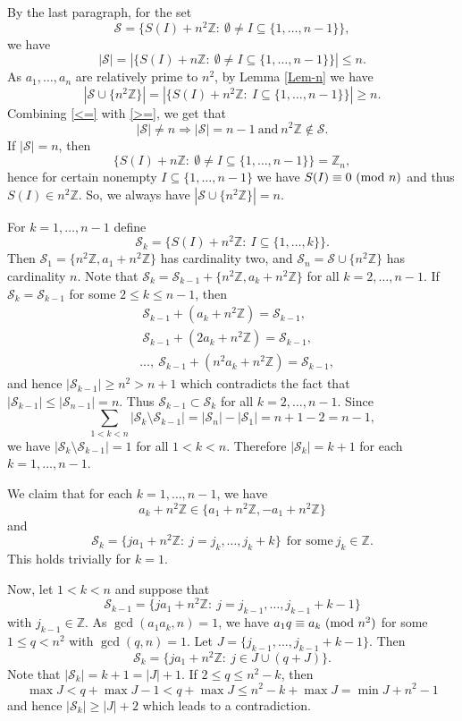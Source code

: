 \documentclass[11pt,reqno]{amsart}
\def\pmod #1{\ ({\rm{mod}}\ #1)}
\def\Z{\mathbb Z}
\def\t{\text}
\def\ls{\leqslant}
\def\gs{\geqslant}
\def\se {\subseteq}
\def\sm{\setminus}
\def\eq{\equiv}
\theoremstyle{plain}
\theoremstyle{definition}
\theoremstyle{remark}
\begin{document}
By the last paragraph, for the set
$${\mathcal S}=\{S(I)+n^2\Z:\ \emptyset \not=I\se\{1,\ldots,n-1\}\},$$
we have
\begin{equation}\label{<=}
|{\mathcal S}|=|\{S(I)+n\Z:\ \emptyset \not=I\se\{1,\ldots,n-1\}\}|\ls n.
\end{equation}
As $a_1,\ldots,a_n$ are relatively prime to $n^2$, by Lemma \ref{Lem-n} we have
\begin{equation}\label{>=} |{\mathcal S}\cup\{n^2\Z\}|=|\{S(I)+n^2\Z:\  I\se\{1,\ldots,n-1\}\}|\gs n.
\end{equation}
Combining \eqref{<=} with \eqref{>=}, we get that
$$|{\mathcal S}|\not=n\Rightarrow |{\mathcal S}|=n-1\ \t{and}\ n^2\Z\not\in {\mathcal S}.$$
If $|{\mathcal S}|=n$, then
$$\{S(I)+n\Z:\ \emptyset \not=I\se\{1,\ldots,n-1\}\}=\Z_n,$$
hence for certain nonempty $I\se\{1,\ldots,n-1\}$ we have $S(I)\eq0\pmod n$ and thus $S(I)\in n^2\Z$.
So, we always have $|{\mathcal S}\cup\{n^2\Z\}|=n$.

For $k=1,\ldots,n-1$ define
$${\mathcal S}_k=\{S(I)+n^2\Z:\ I\se\{1,\ldots,k\}\}.$$
Then ${\mathcal S}_1=\{n^2\Z,a_1+n^2\Z\}$ has cardinality two, and ${\mathcal S}_n={\mathcal S}\cup\{n^2\Z\}$ has cardinality $n$.
Note that ${\mathcal S_{k}}={\mathcal S}_{k-1}+\{n^2\Z,a_k+n^2\Z\}$
for all $k=2,\ldots,n-1$. If ${\mathcal S}_k={\mathcal S}_{k-1}$ for some $2\ls k\ls n-1$, then
\begin{align*}&\ {\mathcal S}_{k-1}+(a_k+n^2\Z)={\mathcal S}_{k-1},
\\&\
{\mathcal S}_{k-1}+(2a_k+n^2\Z)={\mathcal S}_{k-1},
\\& \ldots,\
{\mathcal S}_{k-1}+(n^2a_k+n^2\Z)={\mathcal S}_{k-1},
\end{align*}
and hence $|{\mathcal S}_{k-1}|\gs n^2>n+1$ which contradicts
the fact that $|{\mathcal S}_{k-1}|\ls |{\mathcal S}_{n-1}|=n$.
Thus ${\mathcal S}_{k-1}\subset {\mathcal S}_k$ for all $k=2,\ldots,n-1$.
Since
$$\sum_{1<k<n} |{\mathcal S}_k\sm {\mathcal S}_{k-1}|=
|{\mathcal S}_n|-|{\mathcal S}_1|=n+1-2=n-1,$$
we have $|{\mathcal S}_k\sm {\mathcal S}_{k-1}|=1$ for all $1<k<n$.
Therefore $|{\mathcal S}_k|=k+1$ for each $k=1,\ldots,n-1$.

We claim that for each $k=1,\ldots,n-1$, we have
$$a_k+n^2\Z\in\{a_1+n^2\Z,-a_1+n^2\Z\}$$
and
$$ {\mathcal S}_k=\{ja_1+n^2\Z:\ j=j_k,\ldots,j_k+k\}\ \ \t{for some}\ j_k\in\Z.$$
This holds trivially for $k=1$.

Now, let $1<k<n$ and suppose that
$$ {\mathcal S}_{k-1}=\{ja_1+n^2\Z:\ j=j_{k-1},\ldots,j_{k-1}+k-1\}$$
with $j_{k-1}\in\Z.$ As $\gcd(a_1a_k,n)=1$, we have $a_1q\eq a_k\pmod{n^2}$ for some $1\ls q<n^2$
with $\gcd(q,n)=1$. Let $J=\{j_{k-1},\ldots,j_{k-1}+k-1\}$. Then
$${\mathcal S}_k=\{ja_1+n^2\Z:\ j\in J\cup (q+J)\}.$$
Note that $|{\mathcal S}_k|=k+1=|J|+1$.
If $2\ls q\ls n^2-k$, then
$$\max J<q+\max J-1<q+\max J\ls n^2-k+\max J=\min J+n^2-1$$
and hence $|{\mathcal S}_k|\gs|J|+2$ which leads to a contradiction.
\end{document}
